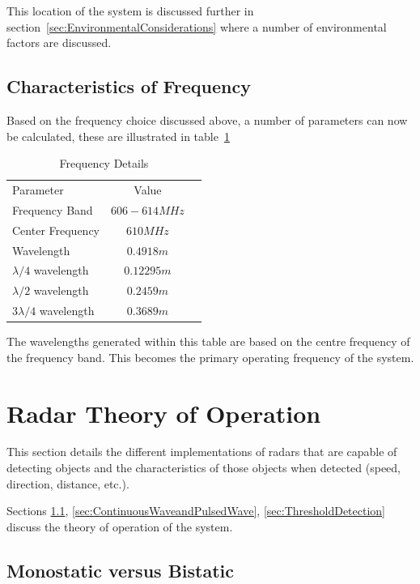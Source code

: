 \documentclass[11pt]{witseiepaper}
\begin{document}
This location of the system is discussed further in section~\ref{sec:EnvironmentalConsiderations} where a number of environmental factors are discussed.


\subsection{Characteristics of Frequency}
Based on the frequency choice discussed above, a number of parameters can now be calculated, these are illustrated in table~\ref{tab:FrequencyDetails}

\begin{table}
    \caption{Frequency Details}
    \label{tab:FrequencyDetails}
    \begin{center}
        \begin{tabular}{p{70mm}cp{70mm}}
            \hline 
            Parameter & Value \\
            Frequency Band & $606 - 614 MHz$ \\
            Center Frequency & $ 610 MHz$ \\
            Wavelength & $0.4918 m$ \\
            $\lambda /4$ wavelength & $0.12295 m$ \\
            $\lambda /2$ wavelength & $0.2459 m$ \\
            $3 \lambda /4$ wavelength & $0.3689 m$ \\                
        \end{tabular}

    \end{center}
\end{table}
The wavelengths generated within this table are based on the centre frequency of the frequency band. This becomes the primary operating frequency of the system.


\section{Radar Theory of Operation} \label{sec:RadarTheoryOfOperation}
This section details the different implementations of radars that are capable of detecting objects and the characteristics of those objects when detected (speed, direction, distance, etc.).

Sections \ref{sec:MonostaticvsBistatic}, \ref{sec:ContinuousWaveandPulsedWave}, \ref{sec:ThresholdDetection} discuss the theory of operation of the system.

\subsection{Monostatic versus Bistatic} \label{sec:MonostaticvsBistatic}
\end{document}
